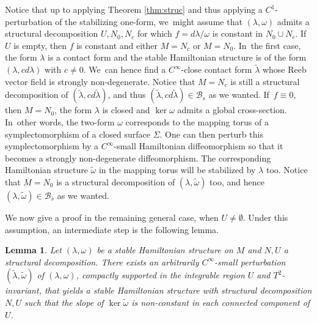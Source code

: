 \documentclass[JEP,XML,SOM,Unicode,NoEqCountersInSection,NoFloatCountersInSection,published]{cedram}
\newtheorem{lemma}[theorem]{Lemma}
\theoremstyle{definition}
\begin{document}
Notice that up to applying Theorem \ref{thm:struc} and thus applying a $C^1$-perturbation of the stabilizing one-form, we~might assume that $(\lambda,\omega)$ admits a structural decomposition $U, N_0, N_c$ for which $f=d\lambda/\omega$ is constant in $N_0\cup N_c$. If~$U$ is empty, then $f$ is constant and either $M=N_c$ or $M=N_0$. In~the first case, the form $\lambda$ is a contact form and the stable Hamiltonian structure is of the form $(\lambda, cd\lambda)$ with $c\neq 0$. We~can hence find a $C^\infty$-close contact form $\widetilde \lambda$ whose Reeb vector field is strongly non-degenerate. Notice that $M=N_c$ is still a structural decomposition of $(\tilde \lambda, cd\tilde \lambda)$, and thus $(\tilde \lambda, cd\tilde \lambda) \in \mathcal{B}_s$ as we wanted. If~$f\equiv 0$, then $M=N_0$, the form $\lambda$ is closed and $\ker \omega$ admits a global cross-section. In~other words, the two-form $\omega$ corresponds to the mapping torus of a symplectomorphism of a closed surface $\Sigma$. One can then perturb this symplectomorphism by a $C^\infty$-small Hamiltonian diffeomorphism so that it becomes a strongly non-degenerate diffeomorphism. The corresponding Hamiltonian structure $\tilde \omega$ in the mapping torus will be stabilized by $\lambda$ too. Notice that $M=N_0$ is a structural decomposition of $(\lambda, \tilde \omega)$ too, and hence $(\lambda,\tilde \omega)\in \mathcal{B}_s$ as we wanted.

We now give a proof in the remaining general case, \ie when $U\neq \emptyset$. Under this assumption, an intermediate step is the following lemma.

\begin{lemma}\label{lem:nonconstantslope}
Let $(\lambda,\omega)$ be a stable Hamiltonian structure on $M$ and $N,U$ a structural decomposition. There exists an arbitrarily $C^\infty$-small perturbation $(\widetilde \lambda,\widetilde \omega)$ of $(\lambda,\omega)$, compactly supported in the integrable region $U$ and $T^2$-invariant, that yields a stable Hamiltonian structure with structural decomposition $N,U$ such that the slope of $\ker \widetilde \omega$ is non-constant in each connected component of $U$.
\end{lemma}
\end{document}
